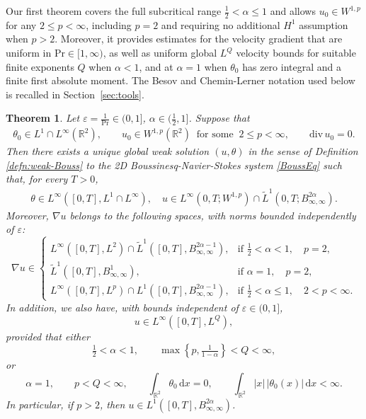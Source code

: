 \documentclass[reqno,11pt,a4paper]{amsart}
\newtheorem{theorem}{Theorem}[section]
\newcommand{\dd}{\mathrm{d}}
\begin{document}
Our first theorem covers the full subcritical range
$\frac12<\alpha\leq1$ and allows
$u_0\in W^{1,p}$ for any $2\leq p<\infty$,
including $p=2$ and requiring no additional $H^1$
assumption when $p>2$.
Moreover, it provides estimates for the velocity gradient
that are uniform in $\mathrm{Pr}\in[1,\infty)$,
as well as uniform global $L^Q$ velocity bounds
for suitable finite exponents $Q$ when $\alpha<1$,
and at $\alpha=1$ when $\theta_0$ has zero integral
and a finite first absolute moment.
The Besov and Chemin-Lerner notation used below
is recalled in Section~\ref{sec:tools}.
\begin{theorem}\label{thm:main1}
Let $\varepsilon =\frac{1}{\mathrm{Pr}} \in (0,1]$, $\alpha\in (\frac{1}{2},1]$.
Suppose that 
\begin{align*}
  \theta_0\in L^1\cap L^\infty(\mathbb{R}^2),\qquad u_0\in W^{1,p}(\mathbb{R}^2)\;\; \textrm{for some}
  \;\;2\leq p<\infty,\qquad \mathrm{div}\,u_0=0.
\end{align*}
Then there exists a unique global weak solution $(u,\theta)$ in the sense of Definition \ref{defn:weak-Bouss} 
to the 2D Boussinesq-Navier-Stokes system \eqref{BoussEq} 
such that, for every $T>0$,
\begin{align*}
  \theta\in L^\infty([0,T],L^1\cap L^\infty),\quad u\in L^\infty (0,T;W^{1,p})\cap \widetilde{L}^1(0,T;B^{2\alpha}_{\infty,\infty}).
\end{align*}
Moreover, $\nabla u$ belongs to the following spaces,
with norms bounded independently of $\varepsilon$:
\[
\nabla u\in
\begin{cases}
  L^\infty([0,T],L^2)
  \cap\widetilde L^1([0,T],B^{2\alpha-1}_{\infty,\infty}),
  & \text{if }\frac12<\alpha<1,\quad p=2,\\
  \widetilde L^1([0,T],B^1_{\infty,\infty}),
  & \text{if }\alpha=1,\quad p=2,\\
  L^\infty([0,T],L^p)
  \cap L^1([0,T],B^{2\alpha-1}_{\infty,\infty}),
  & \text{if }\frac12<\alpha\leq1,\quad 2<p<\infty.
\end{cases}
\]
In addition, we also have, with bounds independent of
$\varepsilon\in(0,1]$,
\begin{equation}\label{eq:u-in-LQ-unif}
  u\in L^\infty([0,T],L^Q),
\end{equation}
provided that either
\[
  \tfrac12<\alpha<1,
  \qquad
  \max\left\{p,\tfrac1{1-\alpha}\right\}<Q<\infty,
\]
or
\[
  \alpha=1,\qquad p<Q<\infty,\qquad
  \int_{\mathbb R^2}\theta_0\,\dd x=0,\qquad
  \int_{\mathbb R^2}|x|\,|\theta_0(x)|\,\dd x<\infty.
\]
In particular, if $p>2$, then $u\in L^1([0,T],B^{2\alpha}_{\infty,\infty})$.
\end{theorem}
\end{document}
